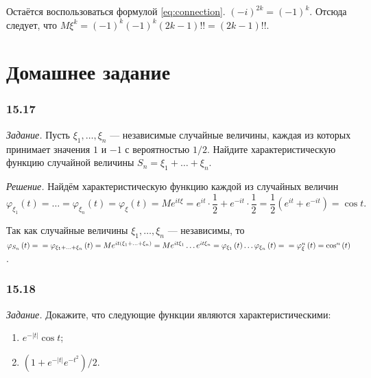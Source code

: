 Остаётся воспользоваться формулой \eqref{eq:connection}.
$ \left( -i \right)^{2k} =
\left( -1 \right)^k$.
Отсюда следует, что $M \xi^k = \left( -1 \right)^k \left( -1 \right)^k \left( 2k - 1 \right)!! = \left( 2k - 1 \right)!!$.

\section*{Домашнее задание}

\subsubsection*{15.17}

\textit{Задание.} Пусть $ \xi_1, \dotsc, \xi_n$ --- независимые случайные величины, каждая из которых принимает значения $1$ и $- 1$ с вероятностью $1 / 2$.
Найдите характеристическую функцию случайной величины $S_n = \xi_1 + \dotsc + \xi_n$.

\textit{Решение.} Найдём характеристическую функцию каждой из случайных величин
$$ \varphi_{ \xi_1} \left( t \right) =
\dotsc =
\varphi_{ \xi_n} \left( t \right) =
\varphi_{ \xi } \left( t \right) =
Me^{it \xi } =
e^{it} \cdot \frac{1}{2} + e^{- it} \cdot \frac{1}{2} =
\frac{1}{2} \left( e^{it} + e^{- it} \right) =
\cos t.$$

Так как случайные величины $ \xi_1, \dotsc, \xi_n$ --- независимы,
то
$ \varphi_{S_n} \left( t \right) = \\
= \varphi_{ \xi_1 + \dotsc + \xi_n} \left( t \right) =
Me^{it \left( \xi_1 + \dotsc + \xi_n \right) } =
Me^{it \xi_1} \dotsc e^{it \xi_n} =
\varphi_{ \xi_1} \left( t \right) \dotsc \varphi_{ \xi_n} \left( t \right) = \\
= \varphi_{ \xi}^n \left( t \right) =
\cos^n \left( t \right) $.

\subsubsection*{15.18}

\textit{Задание.} Докажите, что следующие функции являются характеристическими:
\begin{enumerate}[label=\alph*)]
\item $e^{- \left| t \right| } \cos t$;
\item $ \left( 1 + e^{- \left| t \right| }e^{- t^2} \right) / 2$.
\end{enumerate}

